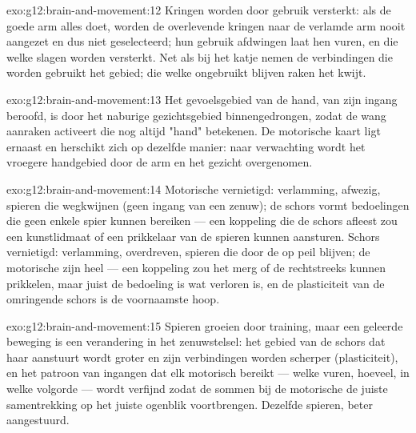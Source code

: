 \begin{solution}{exo:g12:brain-and-movement:12}
Kringen worden door gebruik versterkt: als de goede arm alles doet, worden
de overlevende kringen naar de verlamde arm nooit aangezet en dus niet
geselecteerd; hun gebruik afdwingen laat hen vuren, en die welke slagen
worden versterkt. Net als bij het katje nemen de verbindingen die worden
gebruikt het gebied; die welke ongebruikt blijven raken het kwijt.
\end{solution}

\begin{solution}{exo:g12:brain-and-movement:13}
Het gevoelsgebied van de hand, van zijn ingang beroofd, is door het
naburige gezichtsgebied binnengedrongen, zodat de wang aanraken 
activeert die nog altijd "hand" betekenen. De motorische kaart ligt
ernaast en herschikt zich op dezelfde manier: naar verwachting wordt het
vroegere handgebied door de arm en het gezicht overgenomen.
\end{solution}

\begin{solution}{exo:g12:brain-and-movement:14}
Motorische  vernietigd: verlamming,  afwezig, spieren die
wegkwijnen (geen ingang van een zenuw); de schors vormt bedoelingen die
geen enkele spier kunnen bereiken --- een koppeling die de schors afleest
zou een kunstlidmaat of een prikkelaar van de spieren kunnen aansturen.
Schors vernietigd: verlamming,  overdreven, spieren die door de
 op peil blijven; de motorische  zijn heel --- een
koppeling zou het merg of de  rechtstreeks kunnen prikkelen, maar
juist de bedoeling is wat verloren is, en de plasticiteit van de
omringende schors is de voornaamste hoop.
\end{solution}

\begin{solution}{exo:g12:brain-and-movement:15}
Spieren groeien door training, maar een geleerde beweging is een
verandering in het zenuwstelsel: het gebied van de schors dat haar
aanstuurt wordt groter en zijn verbindingen worden scherper
(plasticiteit), en het patroon van ingangen dat elk motorisch 
bereikt --- welke vuren, hoeveel, in welke volgorde --- wordt verfijnd
zodat de sommen bij de motorische  de juiste samentrekking op het
juiste ogenblik voortbrengen. Dezelfde spieren, beter aangestuurd.
\end{solution}

